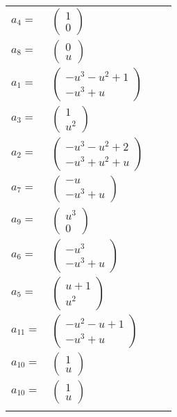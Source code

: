 \documentclass[1p]{elsarticle_modified}
\theoremstyle{definition}
\begin{document}
\begin{tabular}{m{7pt} m{180pt} m{7pt} m{180pt} }
\flushright $a_{4}=$&$\begin{pmatrix}1\\0\end{pmatrix}$ \\
\flushright $a_{8}=$&$\begin{pmatrix}0\\u\end{pmatrix}$ \\
\flushright $a_{1}=$&$\begin{pmatrix}- u^3- u^2+1\\- u^3+u\end{pmatrix}$ \\
\flushright $a_{3}=$&$\begin{pmatrix}1\\u^2\end{pmatrix}$ \\
\flushright $a_{2}=$&$\begin{pmatrix}- u^3- u^2+2\\- u^3+u^2+u\end{pmatrix}$ \\
\flushright $a_{7}=$&$\begin{pmatrix}- u\\- u^3+u\end{pmatrix}$ \\
\flushright $a_{9}=$&$\begin{pmatrix}u^3\\0\end{pmatrix}$ \\
\flushright $a_{6}=$&$\begin{pmatrix}- u^3\\- u^3+u\end{pmatrix}$ \\
\flushright $a_{5}=$&$\begin{pmatrix}u+1\\u^2\end{pmatrix}$ \\
\flushright $a_{11}=$&$\begin{pmatrix}- u^2- u+1\\- u^3+u\end{pmatrix}$ \\
\flushright $a_{10}=$&$\begin{pmatrix}1\\u\end{pmatrix}$\\ \flushright $a_{10}=$&$\begin{pmatrix}1\\u\end{pmatrix}$\\&\end{tabular}
\end{document}
